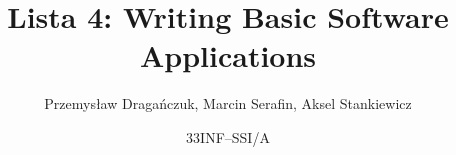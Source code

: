 


\title{Lista 4: Writing Basic Software Applications}
\author{Przemysław Dragańczuk, Marcin Serafin, Aksel Stankiewicz}
\date{33INF--SSI/A}



\maketitle
\newpage







